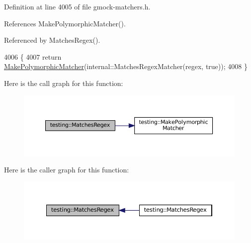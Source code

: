 Definition at line 4005 of file gmock-\/matchers.\+h.



References Make\+Polymorphic\+Matcher().



Referenced by Matches\+Regex().


\begin{DoxyCode}
4006                              \{
4007   \textcolor{keywordflow}{return} \hyperlink{namespacetesting_a667ca94f190ec2e17ee2fbfdb7d3da04}{MakePolymorphicMatcher}(internal::MatchesRegexMatcher(regex, \textcolor{keyword}{true}));
4008 \}
\end{DoxyCode}
Here is the call graph for this function\+:
\nopagebreak
\begin{figure}[H]
\begin{center}
\leavevmode
\includegraphics[width=350pt]{namespacetesting_a4dac232f315edc259b62ce88e413b107_cgraph}
\end{center}
\end{figure}
Here is the caller graph for this function\+:
\nopagebreak
\begin{figure}[H]
\begin{center}
\leavevmode
\includegraphics[width=350pt]{namespacetesting_a4dac232f315edc259b62ce88e413b107_icgraph}
\end{center}
\end{figure}
\mbox{\label{namespacetesting_afea6e0eaf0ae69b409fc1c0285df6c8c}} 
